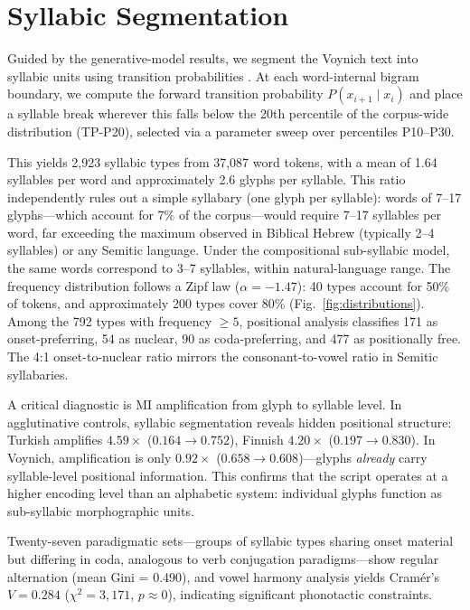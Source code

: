 \section{Syllabic Segmentation}
\label{sec:segmentation}

Guided by the generative-model results, we segment the Voynich text into syllabic units using transition probabilities \citep{saffran1996, harris1955}.  At each word-internal bigram boundary, we compute the forward transition probability $P(x_{i+1} \mid x_i)$ and place a syllable break wherever this falls below the 20th percentile of the corpus-wide distribution (TP-P20), selected via a parameter sweep over percentiles P10--P30.

This yields 2,923 syllabic types from 37,087 word tokens, with a mean of 1.64 syllables per word and approximately 2.6 glyphs per syllable.  This ratio independently rules out a simple syllabary (one glyph per syllable): words of 7--17 glyphs---which account for 7\% of the corpus---would require 7--17 syllables per word, far exceeding the maximum observed in Biblical Hebrew (typically 2--4 syllables) or any Semitic language.  Under the compositional sub-syllabic model, the same words correspond to 3--7 syllables, within natural-language range.  The frequency distribution follows a Zipf law ($\alpha = -1.47$): 40 types account for 50\% of tokens, and approximately 200 types cover 80\% (Fig.~\ref{fig:distributions}).  Among the 792 types with frequency $\geq 5$, positional analysis classifies 171 as onset-preferring, 54 as nuclear, 90 as coda-preferring, and 477 as positionally free.  The 4:1 onset-to-nuclear ratio mirrors the consonant-to-vowel ratio in Semitic syllabaries.

A critical diagnostic is MI amplification from glyph to syllable level.  In agglutinative controls, syllabic segmentation reveals hidden positional structure: Turkish amplifies $4.59\times$ ($0.164 \to 0.752$), Finnish $4.20\times$ ($0.197 \to 0.830$).  In Voynich, amplification is only $0.92\times$ ($0.658 \to 0.608$)---glyphs \emph{already} carry syllable-level positional information.  This confirms that the script operates at a higher encoding level than an alphabetic system: individual glyphs function as sub-syllabic morphographic units.

Twenty-seven paradigmatic sets---groups of syllabic types sharing onset material but differing in coda, analogous to verb conjugation paradigms---show regular alternation (mean Gini = 0.490), and vowel harmony analysis yields Cram\'er's $V = 0.284$ ($\chi^2 = 3{,}171$, $p \approx 0$), indicating significant phonotactic constraints.

